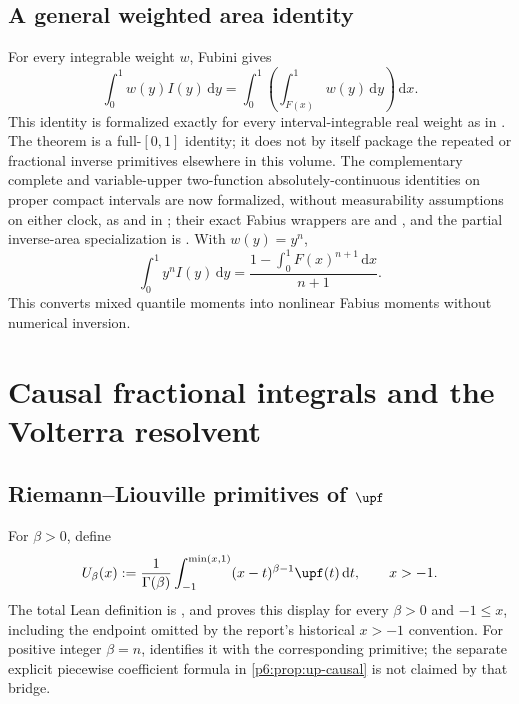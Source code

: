 \documentclass[11pt,oneside]{article}
\theoremstyle{definition}
\theoremstyle{remark}
\newcommand{\dd}{\,\mathrm d}
\newcommand{\1}{\mathbf 1}
\begin{document}
\subsection{A general weighted area identity}

For every integrable weight \(w\), Fubini gives
\begin{equation}
 \int_0^1w(y)I(y)\dd y
 =\int_0^1\left(\int_{F(x)}^1w(y)\dd y\right)\dd x.        \label{p6:eq:weighted-area-inverse}
\end{equation}
This identity is formalized exactly for every interval-integrable real weight as
 in
.  The theorem is a full-\([0,1]\) identity; it does not
by itself package the repeated or fractional inverse primitives elsewhere in this volume.
The complementary complete and variable-upper two-function absolutely-continuous identities
on proper compact intervals are now formalized, without measurability assumptions on either
clock, as
 and
 in
; their exact Fabius wrappers are
 and
, and the
partial inverse-area specialization is
.
With \(w(y)=y^n\),
\begin{equation}
 \int_0^1y^nI(y)\dd y
 =\frac{1-\int_0^1F(x)^{n+1}\dd x}{n+1}.                 \label{p6:eq:inverse-y-moment}
\end{equation}
This converts mixed quantile moments into nonlinear Fabius moments without numerical
inversion.

\section{Causal fractional integrals and the Volterra resolvent}

\subsection{Riemann--Liouville primitives of \(\upf\)}

For \(\beta>0\), define
\begin{equation}
 U_\beta(x):=\frac1{\Gamma(\beta)}
 \int_{-1}^{\min(x,1)}(x-t)^{\beta-1}\upf(t)\dd t,
 \qquad x>-1.                                             \label{p6:eq:fractional-up}
\end{equation}
The total Lean definition is , and
 proves this display for
every \(\beta>0\) and \(-1\le x\), including the endpoint omitted by the report's
historical \(x>-1\) convention.  For positive integer \(\beta=n\),
 identifies it with the corresponding
 primitive; the separate explicit piecewise coefficient formula in
\cref{p6:prop:up-causal} is not claimed by that bridge.
\end{document}
